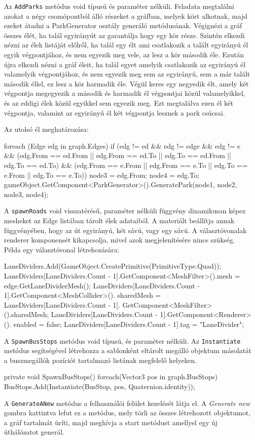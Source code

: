 Az \texttt{AddParks} metódus void típusú és paraméter nélküli. Feladata megtalálni azokat a négy csomópontból álló részeket a gráfban, melyek kört alkotnak, majd ezeket átadni a ParkGenerator osztály generáló metódusának. Végignézi a gráf összes élét, ha talál egyirányút az garantálja hogy egy kör része. Szintén elkezdi nézni az élek listáját előlről, ha talál egy élt ami csatlakozik a talált egyirányú él egyik végpontjához, és nem egyezik meg vele, az lesz a kör második éle. Ezután újra elkezdi nézni a gráf éleit, ha talál egyet amelyik csatlakozik az egyirányú él valamelyik végpontjához, és nem egyezik meg sem az egyirányú, sem a már talált második éllel, ez lesz a kör harmadik éle. Végül keres egy negyedik élt, amely két végpontja megegyezik a második és harmadik él végpontjai közül valamelyikkel, és az eddigi élek közül egyikkel sem egyezik meg. Ezt megtalálva ezen él két végpontja, valamint az egyirányú él két végpontja lesznek a park csúcsai.

Az utolsó él meghatározása:
\begin{cpp}
foreach (Edge edg in graph.Edges)
{
    if (edg != ed && edg != edge && edg != e && (edg.From == ed.From || 
    edg.From == ed.To || edg.To == ed.From || edg.To == ed.To) && 
    (edg.From == e.From || edg.From == e.To || edg.To == e.From || 
    edg.To == e.To))
    {
        node3 = edg.From;
        node4 = edg.To;
        gameObject.GetComponent<ParkGenerator>().GeneratePark(node1, 
        node2, node3, node4);
    }
}
\end{cpp}

A \texttt{spawnRoads} void visszatérésű, paraméter nélküli függvény dinamikusan képez mesheket az Edge listában tárolt élek adataiból. A materiált beállítja annak függvényében, hogy az út egyirányú, két sávú, vagy egy sávú. A választóvonalak renderer komponensét kikapcsolja, mivel azok megjelenítésére nincs szükség. 
Példa egy választóvonal létrehozására:
\begin{cpp}
LaneDividers.Add(GameObject.CreatePrimitive(PrimitiveType.Quad));
LaneDividers[LaneDividers.Count - 1].GetComponent<MeshFilter>().mesh = 
edge.GetLaneDividerMesh();
LaneDividers[LaneDividers.Count - 1].GetComponent<MeshCollider>().
sharedMesh = LaneDividers[LaneDividers.Count - 1].
GetComponent<MeshFilter>().sharedMesh;
LaneDividers[LaneDividers.Count - 1].GetComponent<Renderer>().
enabled = false;
LaneDividers[LaneDividers.Count - 1].tag = "LaneDivider";
\end{cpp}

A \texttt{SpawnBusStops} metódus void típusú, és paraméter nélküli. Az \texttt{Instantiate} metódus segítségével létrehozza a sablonként eltárolt megálló objektum másolatát a buszmegállók pozíciót tartalmazó listának megfelelő helyeken.
\begin{cpp}
private void SpawnBusStops()
    {
        foreach(Vector3 pos in graph.BusStops)
        {
            BusStops.Add(Instantiate(BusStop, pos, Quaternion.identity));
        }
    }
\end{cpp}
A \texttt{GenerateANew} metódus a felhasználói felület kezelését látja el. A \textit{Generate new} gombra kattintva lefut ez a metódus, mely törli az összes létrehozott objektumot, a gráf tartalmát üríti, majd meghívja a start metódust amellyel egy új úthálózatot generál.

